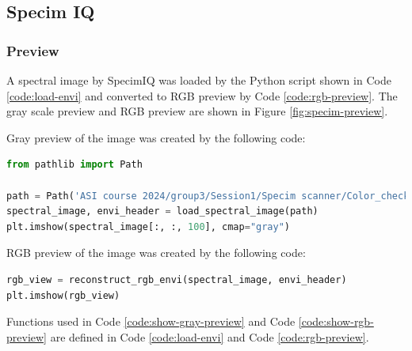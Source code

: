 \subsection{Specim IQ}

\subsubsection{Preview}

A spectral image by SpecimIQ was loaded by the Python script shown in Code \ref{code:load-envi} and converted to RGB preview by Code \ref{code:rgb-preview}. The gray scale preview and RGB preview are shown in Figure \ref{fig:specim-preview}.

Gray preview of the image was created by the following code:

\begin{lstlisting}[language=python, caption=Show gray scale preview, label={code:show-gray-preview}]
from pathlib import Path

path = Path('ASI course 2024/group3/Session1/Specim scanner/Color_checker_8_binning/capture/solutions_scan_0110')
spectral_image, envi_header = load_spectral_image(path)
plt.imshow(spectral_image[:, :, 100], cmap="gray")
\end{lstlisting}

RGB preview of the image was created by the following code:

\begin{lstlisting}[language=python, caption=Show RGB preview, label={code:show-rgb-preview}]
rgb_view = reconstruct_rgb_envi(spectral_image, envi_header)
plt.imshow(rgb_view)
\end{lstlisting}

Functions used in Code \ref{code:show-gray-preview} and Code \ref{code:show-rgb-preview} are defined in Code \ref{code:load-envi} and Code \ref{code:rgb-preview}.

